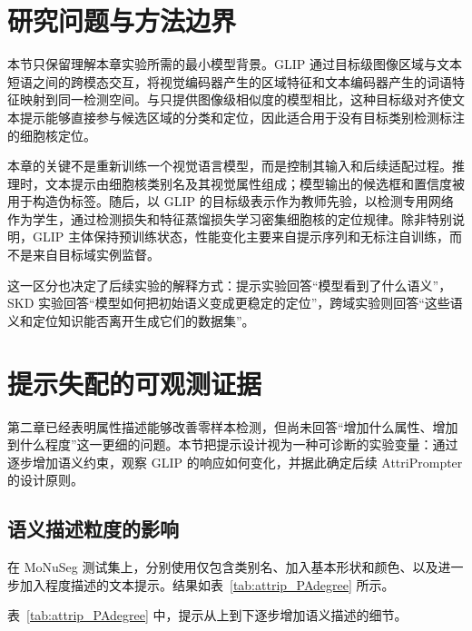 \section{研究问题与方法边界}

本节只保留理解本章实验所需的最小模型背景。GLIP 通过目标级图像区域与文本短语之间的跨模态交互，将视觉编码器产生的区域特征和文本编码器产生的词语特征映射到同一检测空间。与只提供图像级相似度的模型相比，这种目标级对齐使文本提示能够直接参与候选区域的分类和定位，因此适合用于没有目标类别检测标注的细胞核定位。

本章的关键不是重新训练一个视觉语言模型，而是控制其输入和后续适配过程。推理时，文本提示由细胞核类别名及其视觉属性组成；模型输出的候选框和置信度被用于构造伪标签。随后，以 GLIP 的目标级表示作为教师先验，以检测专用网络作为学生，通过检测损失和特征蒸馏损失学习密集细胞核的定位规律。除非特别说明，GLIP 主体保持预训练状态，性能变化主要来自提示序列和无标注自训练，而不是来自目标域实例监督。

这一区分也决定了后续实验的解释方式：提示实验回答“模型看到了什么语义”，SKD 实验回答“模型如何把初始语义变成更稳定的定位”，跨域实验则回答“这些语义和定位知识能否离开生成它们的数据集”。

\section{提示失配的可观测证据}

第二章已经表明属性描述能够改善零样本检测，但尚未回答“增加什么属性、增加到什么程度”这一更细的问题。本节把提示设计视为一种可诊断的实验变量：通过逐步增加语义约束，观察 GLIP 的响应如何变化，并据此确定后续 AttriPrompter 的设计原则。

\subsection{语义描述粒度的影响}

在 MoNuSeg 测试集上，分别使用仅包含类别名、加入基本形状和颜色、以及进一步加入程度描述的文本提示。结果如表~\ref{tab:attrip_PAdegree} 所示。

\begin{table}[t]
\caption{文本提示粒度对检测性能的影响}
\label{tab:attrip_PAdegree}
\begin{center}
\begin{small}
\end{small}
\end{center}
\vskip -0.1in
\end{table}
表~\ref{tab:attrip_PAdegree} 中，提示从上到下逐步增加语义描述的细节。


